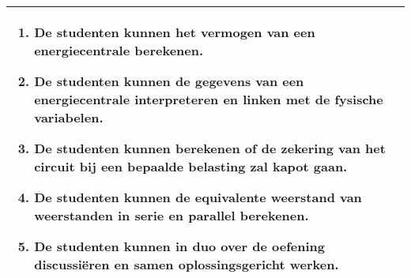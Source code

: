 \begin{landscape}
\begin{tabularx}{1.56\textwidth}{|p{}|X|}
\begin{enumerate}[itemsep=0.08\baselineskip]
			\item De studenten kunnen het vermogen van een energiecentrale berekenen.
			\item De studenten kunnen de gegevens van een energiecentrale interpreteren en linken met de fysische variabelen.
			\item De studenten kunnen berekenen of de zekering van het circuit  bij een bepaalde belasting zal kapot gaan.
			\item  De studenten kunnen de equivalente weerstand van weerstanden in serie en parallel berekenen.
		    \item De studenten kunnen in duo over de oefening discussiëren en samen oplossingsgericht werken.
		\end{enumerate} \\\hline
	\end{tabularx}



\end{landscape}
